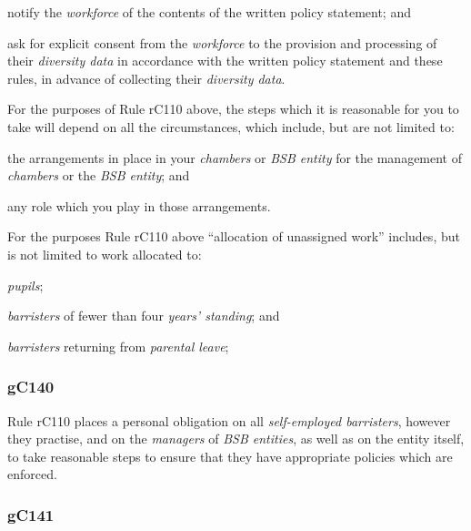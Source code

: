 \begin{numlist}
\begin{alphlist}
\begin{romlist}
\item notify the \emph{workforce} of the contents of the written policy
statement; and

\item ask for explicit consent from the \emph{workforce} to the provision
and processing of their \emph{diversity data} in accordance with the
written policy statement and these rules, in advance of collecting their
\emph{diversity data}.\end{romlist}
\end{alphlist}
\end{numlist}

For the purposes of Rule rC110 above, the steps which it is reasonable
for you to take will depend on all the circumstances, which include, but
are not limited to:
\begin{numlist}
\item the arrangements in place in your \emph{chambers} or \emph{BSB
entity} for the management of \emph{chambers} or the \emph{BSB entity};
and

\item any role which you play in those arrangements.
\end{numlist}

For the purposes Rule rC110 above ``allocation of unassigned work''
includes, but is not limited to work allocated to:
\begin{numlist}\item \emph{pupils};
\item \emph{barristers} of fewer than four \emph{years' standing}; and
\item \emph{barristers} returning from \emph{parental leave};
\end{numlist}



\subsubsection{\color{darkgrey}gC140}

Rule rC110 places a personal obligation on all \emph{self-employed
barristers}, however they practise, and on the \emph{managers} of
\emph{BSB entities}, as well as on the entity itself, to take reasonable
steps to ensure that they have appropriate policies which are enforced.

\subsubsection{\color{darkgrey}gC141}

